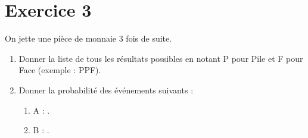 \documentclass{article}
\begin{document}
\section*{Exercice 3}

On jette une pièce de monnaie 3 fois de suite.

\begin{enumerate}
    \item Donner la liste de tous les résultats possibles en notant P pour Pile et F pour Face (exemple : PPF).
    \item Donner la probabilité des événements suivants :
    \begin{enumerate}
        \item A : .
        \item B : .
    \end{enumerate}
\end{enumerate}
\end{document}
